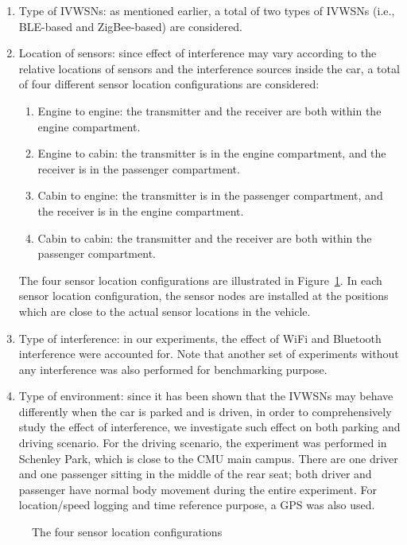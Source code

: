 \documentclass[journal]{IEEEtran}
\begin{document}
\begin{enumerate}
\item Type of IVWSNs: as mentioned earlier, a total of two types of IVWSNs (i.e., BLE-based and ZigBee-based) are considered.
\item Location of sensors: since effect of interference may vary according to the relative locations of sensors and the interference sources inside the car, a total of four different sensor location configurations are considered: 
\begin{enumerate}
\item Engine to engine: the transmitter and the receiver are both within the engine compartment.
\item Engine to cabin: the transmitter is in the engine compartment, and the receiver is in the passenger compartment.
\item Cabin to engine: the transmitter is in the passenger compartment, and the receiver is in the engine compartment.
\item Cabin to cabin: the transmitter and the receiver are both within the passenger compartment.
\end{enumerate}
The four sensor location configurations are illustrated in Figure~\ref{NodeConf}. In each sensor location configuration, the sensor nodes are installed at the positions which are close to the actual sensor locations in the vehicle.
\item Type of interference: in our experiments, the effect of WiFi and Bluetooth interference were accounted for. Note that another set of experiments without any interference was also performed for benchmarking purpose. 
\item Type of environment: since it has been shown that the IVWSNs may behave differently  when the car is parked and is driven, in order to comprehensively study the effect of interference, we investigate such effect on both parking and driving scenario. For the driving scenario, the experiment was performed in Schenley Park, which is close to the CMU main campus. There are one driver and one passenger sitting in the middle of the rear seat; both driver and passenger have normal body movement during the entire experiment. For location/speed logging and time reference purpose, a GPS was also used.
\end{enumerate}

\begin{figure}[tbp]
\centering
{}
\caption[]{The four sensor location configurations}
\label{NodeConf}
\end{figure}
\end{document}
